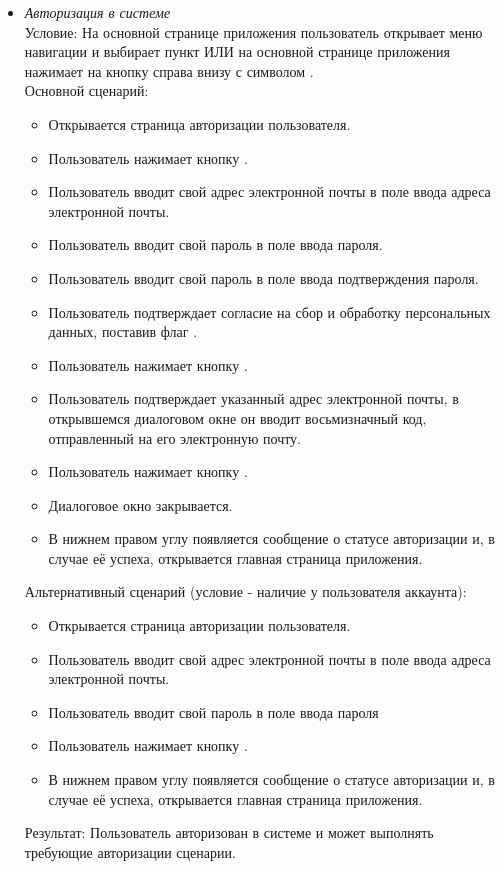 \begin{itemize}[topsep=0pt, parsep=0pt, itemsep=0pt, leftmargin=*, labelindent=0.5cm]
	\item \textit{Авторизация в системе} \\
	Условие: На основной странице приложения пользователь открывает меню навигации и выбирает пункт  ИЛИ на основной странице приложения нажимает на кнопку справа внизу с символом \textquote{+}. \\
	Основной сценарий:
	\begin{itemize}[topsep=0pt, parsep=0pt, itemsep=0pt, leftmargin=*, labelindent=0.5cm]
		\item Открывается страница авторизации пользователя.
		\item Пользователь нажимает кнопку .
		\item Пользователь вводит свой адрес электронной почты в поле ввода адреса электронной почты.
		\item Пользователь вводит свой пароль в поле ввода пароля.
		\item Пользователь вводит свой пароль в поле ввода подтверждения пароля.
		\item Пользователь подтверждает согласие на сбор и обработку персональных данных, поставив флаг .
		\item Пользователь нажимает кнопку .
		\item Пользователь подтверждает указанный адрес электронной почты, в открывшемся диалоговом окне он вводит восьмизначный код, отправленный на его электронную почту.
		\item Пользователь нажимает кнопку .
		\item Диалоговое окно закрывается.
		\item В нижнем правом углу появляется сообщение о статусе авторизации и, в случае её успеха, открывается главная страница приложения.
	\end{itemize}
	Альтернативный сценарий (условие - наличие у пользователя аккаунта):
	\begin{itemize}[topsep=0pt, parsep=0pt, itemsep=0pt, leftmargin=*, labelindent=0.5cm]
		\item Открывается страница авторизации пользователя.
		\item Пользователь вводит свой адрес электронной почты в поле ввода адреса электронной почты.
		\item Пользователь вводит свой пароль в поле ввода пароля
		\item Пользователь нажимает кнопку .
		\item В нижнем правом углу появляется сообщение о статусе авторизации и, в случае её успеха, открывается главная страница приложения.
	\end{itemize}
	Результат: Пользователь авторизован в системе и может выполнять требующие авторизации сценарии.
	

\end{itemize}
